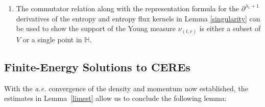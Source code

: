\documentclass[reqno,11pt]{amsart}
\numberwithin{equation}{section}
\theoremstyle{definition}
\begin{document}
\begin{enumerate}
    \vspace{0.3cm}
    \item[\rm (iv)] The commutator relation along with the representation formula 
    for the $\partial^{\lambda_1 + 1}$ derivatives of the entropy and entropy flux kernels 
    in Lemma \ref{singularity} can be used to show the support of 
    the Young measure $\nu_{(t,r)}$ is either a subset of $V$ or a single point in $\mathbb{H}$.
\end{enumerate}

\subsection{Finite-Energy Solutions to CEREs}
With the {\it a.e.} convergence of the density and momentum now established, 
the estimates in Lemma~\ref{limest} allow us to conclude the following lemma:
\end{document}

